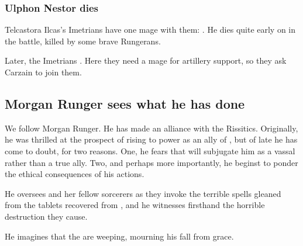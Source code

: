 \subsubsection{Ulphon Nestor dies}
Telcastora Ilcas's Imetrians have one mage with them: 
. 
He dies quite early on in the battle, killed by some brave Rungerans. 

Later, the Imetrians .
Here they need a mage for artillery support, so they ask Carzain to join them. 









\subsection{Morgan Runger sees what he has done}
We follow Morgan Runger. He has made an alliance with the Rissitics. Originally, he was thrilled at the prospect of rising to power as an ally of \Durcac, but of late he has come to doubt, for two reasons. One, he fears that \Nechsain{} will subjugate him as a vassal rather than a true ally. Two, and perhaps more importantly, he beginst to ponder the ethical consequences of his actions. 

He oversees \Takestsha{} and her fellow sorcerers as they invoke the terrible spells gleaned from the tablets recovered from \Rungertemple, and he witnesses firsthand the horrible destruction they cause. 

He imagines that the \sephiroth{} are weeping, mourning his fall from grace.



